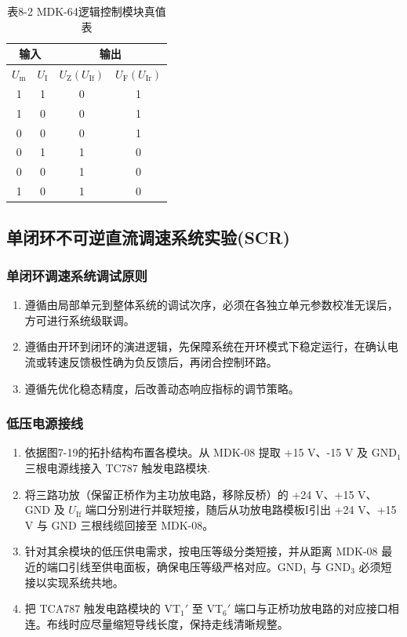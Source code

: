 \begin{framed}
{			\begin{table}[H]
				\centering
				\caption{表8-2 MDK-64逻辑控制模块真值表}
				\begin{tabular}{cc|cc}
					\hline
					\multicolumn{2}{c|}{输入} & \multicolumn{2}{|c}{输出} \\
					\hline
					$U_\text{m}$ & $U_\text{I}$ & $U_\text{Z}(U_\text{If})$ & $U_\text{F}(U_\text{Ir})$ \\
					\hline
					1 & 1 & 0 & 1 \\
					1 & 0 & 0 & 1 \\
					0 & 0 & 0 & 1 \\
					0 & 1 & 1 & 0 \\
					0 & 0 & 1 & 0 \\
					1 & 0 & 1 & 0 \\
					\hline
				\end{tabular}
			\end{table}
			
			\subsection{单闭环不可逆直流调速系统实验(SCR)}
			\subsubsection{单闭环调速系统调试原则}
			\begin{enumerate}
				\item 遵循由局部单元到整体系统的调试次序，必须在各独立单元参数校准无误后，方可进行系统级联调。
				\item 遵循由开环到闭环的演进逻辑，先保障系统在开环模式下稳定运行，在确认电流或转速反馈极性确为负反馈后，再闭合控制环路。
				\item 遵循先优化稳态精度，后改善动态响应指标的调节策略。
			\end{enumerate}
			
			\subsubsection{低压电源接线}
			\begin{enumerate}
				\item 依据图7-19的拓扑结构布置各模块。从 MDK-08 提取 +15 V、-15 V 及 $\text{GND}_1$ 三根电源线接入 TC787 触发电路模块.
				\item 将三路功放（保留正桥作为主功放电路，移除反桥）的 +24 V、+15 V、GND 及 $U_{\text{If}}$ 端口分别进行并联短接，随后从功放电路模板I引出 +24 V、+15 V 与 GND 三根线缆回接至 MDK-08。
				\item 针对其余模块的低压供电需求，按电压等级分类短接，并从距离 MDK-08 最近的端口引线至供电面板，确保电压等级严格对应。$\text{GND}_1$ 与 $\text{GND}_3$ 必须短接以实现系统共地。
				\item 把 TCA787 触发电路模块的 $\text{VT}_1'$ 至 $\text{VT}_6'$ 端口与正桥功放电路的对应接口相连。布线时应尽量缩短导线长度，保持走线清晰规整。
			\end{enumerate}
			
}
\end{framed}
